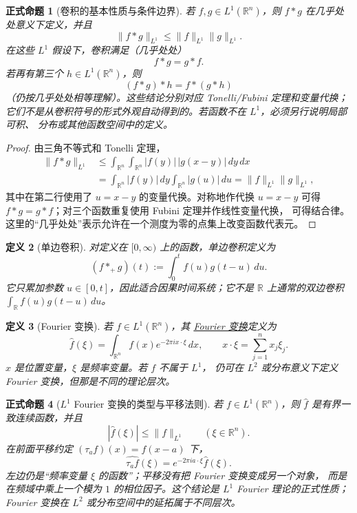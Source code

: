 \documentclass[UTF8,fontset=none,a4paper,11pt]{ctexart}
\theoremstyle{foundation-definition}
\newtheorem{definition}{定义}[section]
\theoremstyle{foundation-theorem}
\theoremstyle{foundation-proposition}
\newtheorem{proposition}[definition]{正式命题}
\theoremstyle{foundation-example}
\theoremstyle{foundation-remark}
\theoremstyle{foundation-theorem}
\newcommand{\term}[2]{\hyperref[#1]{#2}}
\begin{document}
\begin{proposition}[卷积的基本性质与条件边界]\label{prop:convolution-basic}
若 \(f,g\in L^1(\mathbb R^n)\)，则 \(f*g\) 在几乎处处意义下定义，并且
\[
\|f*g\|_{L^1}\leq \|f\|_{L^1}\|g\|_{L^1}.
\]
在这些 \(L^1\) 假设下，卷积满足（几乎处处）
\[
f*g=g*f.
\]
若再有第三个 \(h\in L^1(\mathbb R^n)\)，则
\[
(f*g)*h=f*(g*h)
\]
（仍按几乎处处相等理解）。这些结论分别对应 Tonelli/Fubini 定理和变量代换；
它们不是从卷积符号的形式外观自动得到的。若函数不在 \(L^1\)，必须另行说明局部可积、
分布或其他函数空间中的定义。
\end{proposition}

\begin{proof}
由三角不等式和 Tonelli 定理，
\[
\begin{aligned}
\|f*g\|_{L^1}
&\leq \int_{\mathbb R^n}\int_{\mathbb R^n}
 |f(y)|\,|g(x-y)|\,dy\,dx\\
&=\int_{\mathbb R^n}|f(y)|\,dy
  \int_{\mathbb R^n}|g(u)|\,du
=\|f\|_{L^1}\|g\|_{L^1},
\end{aligned}
\]
其中在第二行使用了 \(u=x-y\) 的变量代换。对称地作代换
\(u=x-y\) 可得 \(f*g=g*f\)；对三个函数重复使用 Fubini 定理并作线性变量代换，
可得结合律。这里的“几乎处处”表示允许在一个测度为零的点集上改变函数代表元。
\end{proof}

\begin{definition}[单边卷积]\label{def:one-sided-convolution}
对定义在 \([0,\infty)\) 上的函数，单边卷积定义为
\[
(f*_{+}g)(t):=\int_0^t f(u)g(t-u)\,du.
\]
它只累加参数 \(u\in[0,t]\)，因此适合因果时间系统；它不是
\(\mathbb R\) 上通常的双边卷积 \(\int_{\mathbb R}f(u)g(t-u)\,du\)。
\end{definition}

\begin{definition}[Fourier 变换]\label{def:fourier-transform}
若 \(f\in L^1(\mathbb R^n)\)，其
\term{def:fourier-transform}{Fourier 变换}定义为
\[
\widehat f(\xi)=\int_{\mathbb R^n}f(x)e^{-2\pi i x\cdot\xi}\,dx,
\qquad x\cdot\xi=\sum_{j=1}^nx_j\xi_j.
\]
\(x\) 是位置变量，\(\xi\) 是频率变量。若 \(f\) 不属于 \(L^1\)，
仍可在 \(L^2\) 或分布意义下定义 Fourier 变换，但那是不同的理论层次。
\end{definition}

\begin{proposition}[\(L^1\) Fourier 变换的类型与平移法则]\label{prop:fourier-l1-properties}
若 \(f\in L^1(\mathbb R^n)\)，则 \(\widehat f\) 是有界一致连续函数，并且
\[
|\widehat f(\xi)|\leq\|f\|_{L^1}\qquad(\xi\in\mathbb R^n).
\]
在前面平移约定 \((\tau_a f)(x)=f(x-a)\) 下，
\[
\widehat{\tau_a f}(\xi)
=e^{-2\pi i a\cdot\xi}\widehat f(\xi).
\]
左边仍是“频率变量 \(\xi\) 的函数”；平移没有把 Fourier 变换变成另一个对象，
而是在频域中乘上一个模为 \(1\) 的相位因子。这个结论是 \(L^1\) Fourier 理论的正式性质；
Fourier 变换在 \(L^2\) 或分布空间中的延拓属于不同层次。
\end{proposition}
\end{document}

